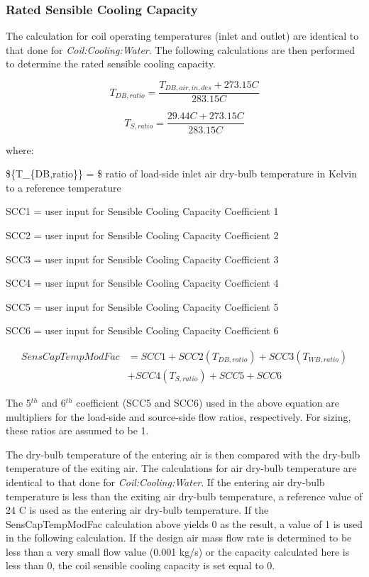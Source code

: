 \subsubsection{Rated Sensible Cooling Capacity}\label{rated-sensible-cooling-capacity}

The calculation for coil operating temperatures (inlet and outlet) are identical to that done for \emph{Coil:Cooling:Water}. The following calculations are then performed to determine the rated sensible cooling capacity.

\begin{equation}
  T_{DB,ratio} = \frac{T_{DB,air,in,des}+273.15C}{283.15C}
\end{equation}

\begin{equation}
  T_{S,ratio} = \frac{29.44C+273.15C}{283.15C}
\end{equation}

where:

\$\{T\_\{DB,ratio\}\} = \$ ratio of load-side inlet air dry-bulb temperature in Kelvin to a reference temperature

SCC1 = user input for Sensible Cooling Capacity Coefficient 1

SCC2 = user input for Sensible Cooling Capacity Coefficient 2

SCC3 = user input for Sensible Cooling Capacity Coefficient 3

SCC4 = user input for Sensible Cooling Capacity Coefficient 4

SCC5 = user input for Sensible Cooling Capacity Coefficient 5

SCC6 = user input for Sensible Cooling Capacity Coefficient 6

\begin{equation}
  \begin{array}{rl}
    SensCapTempModFac &= SCC1 + SCC2\left( {{T_{DB,ratio}}} \right) + SCC3\left( {{T_{WB,ratio}}} \right) \\
                      &+ SCC4\left( {{T_{S,ratio}}} \right) + SCC5 + SCC6
  \end{array}
\end{equation}

The 5\(^{th}\) and 6\(^{th}\) coefficient (SCC5 and SCC6) used in the above equation are multipliers for the load-side and source-side flow ratios, respectively. For sizing, these ratios are assumed to be 1.

The dry-bulb temperature of the entering air is then compared with the dry-bulb temperature of the exiting air. The calculations for air dry-bulb temperature are identical to that done for \emph{Coil:Cooling:Water}. If the entering air dry-bulb temperature is less than the exiting air dry-bulb temperature, a reference value of 24 C is used as the entering air dry-bulb temperature. If the SensCapTempModFac calculation above yields 0 as the result, a value of 1 is used in the following calculation. If the design air mass flow rate is determined to be less than a very small flow value (0.001 kg/s) or the capacity calculated here is less than 0, the coil sensible cooling capacity is set equal to 0.

